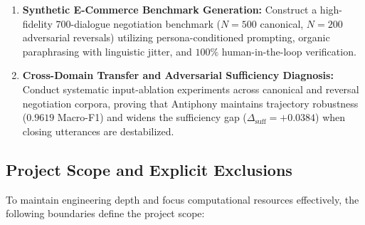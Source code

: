 \begin{enumerate}[label=\textbf{O\arabic*.}]
  \item \textbf{Synthetic E-Commerce Benchmark Generation:} Construct a high-fidelity 700-dialogue negotiation benchmark ($N=500$ canonical, $N=200$ adversarial reversals) utilizing persona-conditioned prompting, organic paraphrasing with linguistic jitter, and $100\%$ human-in-the-loop verification.
  \item \textbf{Cross-Domain Transfer and Adversarial Sufficiency Diagnosis:} Conduct systematic input-ablation experiments across canonical and reversal negotiation corpora, proving that Antiphony maintains trajectory robustness ($0.9619$ Macro-F1) and widens the sufficiency gap ($\Delta_{\text{suff}} = +0.0384$) when closing utterances are destabilized.
\end{enumerate}

\subsection{Project Scope and Explicit Exclusions}
To maintain engineering depth and focus computational resources effectively, the following boundaries define the project scope:

